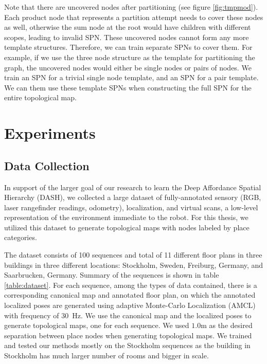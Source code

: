 \documentclass[10pt, titlepage]{article}
\theoremstyle{definition}
\begin{document}
Note that there are uncovered nodes after partitioning (see figure \ref{fig:tmpmod}). Each product node that represents a partition attempt needs to cover these nodes as well, otherwise the sum node at the root would have children with different scopes, leading to invalid SPN. These uncovered nodes cannot form any more template structures. 
Therefore, we can train separate SPNs to cover them. For example, if we use the three node structure as the template for partitioning the graph, the uncovered nodes would either be single nodes or pairs of nodes. We train an SPN for a trivial single node template, and an SPN for a pair template. We can them use these template SPNs when constructing the full SPN for the entire topological map.


\newpage
\section{Experiments}\label{section:experiment}
\subsection{Data Collection}\label{section:data}

In support of the larger goal of our research to learn the Deep Affordance Spatial Hierarchy (DASH), we collected a large dataset of fully-annotated sensory (RGB, laser rangefinder readings, odometry), localization, and virtual scans, a low-level representation of the environment immediate to the robot. For this thesis, we utilized this dataset to generate topological maps with nodes labeled by place categories.

The dataset consists of 100 sequences and total of 11 different floor plans in three buildings in three different locations: Stockholm, Sweden, Freiburg, Germany, and Saarbrucken, Germany. Summary of the sequences is shown in table \ref{table:dataset}. For each sequence, among the types of data contained,  there is a corresponding canonical map and annotated floor plan, on which the annotated localized poses are generated using adaptive Monte-Carlo Localization (AMCL) with frequency of 30~Hz. We use the canonical map and the localized poses to generate topological maps, one for each sequence. We used $1.0$m as the desired separation between place nodes when generating topological maps. We trained and tested our methods mostly on the Stockholm sequences as the building in Stockholm has much larger number of rooms and bigger in scale.
\end{document}
